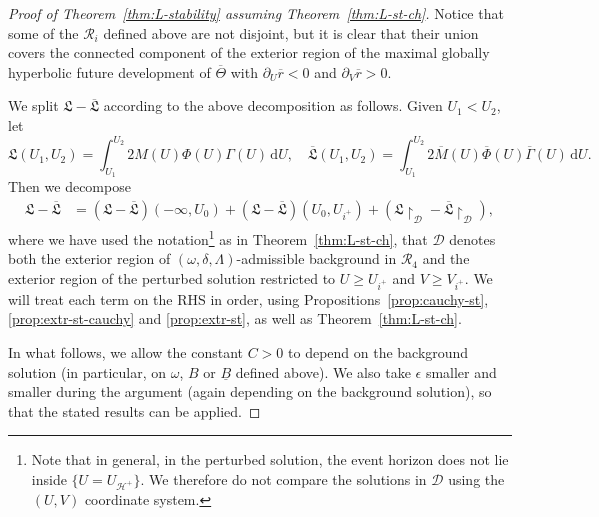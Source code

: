 \documentclass[10pt, reqno]{amsart}
\theoremstyle{definition}
\theoremstyle{remark}
\theoremstyle{conjecture}
\numberwithin{equation}{section}
\newcommand{\ud}{\mathrm{d}}
\newcommand{\rd}{\partial}
\newcommand{\0}{\emptyset}
\newcommand{\Gmm}{\Gamma}
\newcommand{\eps}{\epsilon}
\newcommand{\Lmb}{\Lambda}
\newcommand{\Tht}{\Theta}
\newcommand{\omg}{\omega}
\newcommand{\calD}{\mathcal D}
\newcommand{\calH}{\mathcal H}
\newcommand{\calR}{\mathcal R}
\newcommand{\de}{\delta}
\newcommand{\EH}{\calH^{+}}
\newcommand{\rbg}{\overline{r}}					%
\begin{document}
\begin{proof}[Proof of Theorem~\ref{thm:L-stability} assuming Theorem~\ref{thm:L-st-ch}]
Notice that some of the $\calR_i$ defined above are not disjoint, but it is clear that their union covers the connected component of the exterior region of the maximal globally hyperbolic future development of $\overline{\Tht}$ with $\rd_U \rbg<0$ and $\rd_V \rbg>0$.

We split $\mathfrak{L} - \overline{\mathfrak{L}}$ according to the above decomposition as follows. Given $U_{1} < U_{2}$, let
\begin{equation*}
	\mathfrak{L}(U_{1}, U_{2}) = \int_{U_{1}}^{U_{2}} 2 M(U) \Phi(U) \Gmm(U) \, \ud U, \quad
	\overline{\mathfrak{L}}(U_{1}, U_{2}) = \int_{U_{1}}^{U_{2}} 2 \overline{M}(U) \overline{\Phi}(U) \overline{\Gmm}(U) \, \ud U.
\end{equation*}
Then we decompose
\begin{align*}
	\mathfrak{L} - \overline{\mathfrak{L}}
	& = (\mathfrak{L} - \overline{\mathfrak{L}})(-\infty, U_{0}) 
	+ (\mathfrak{L} - \overline{\mathfrak{L}})(U_{0}, U_{i^{+}}) 
	+ (\mathfrak{L} \restriction_{\calD} - \overline{\mathfrak{L}}\restriction_{\calD}),
\end{align*}
where we have used the notation\footnote{Note that in general, in the perturbed solution, the event horizon does not lie inside $\{U=U_{\EH}\}$. We therefore do not compare the solutions in $\calD$ using the $(U,V)$ coordinate system.} as in Theorem~\ref{thm:L-st-ch}, that $\calD$ denotes both the exterior region of $(\omg,\de,\Lmb)$-admissible background in $\calR_4$ and the exterior region of the perturbed solution restricted to $U\geq U_{i^+}$ and $V\geq V_{i^+}$.
We will treat each term on the RHS in order, using Propositions~\ref{prop:cauchy-st}, \ref{prop:extr-st-cauchy} and \ref{prop:extr-st}, as well as Theorem~\ref{thm:L-st-ch}.

In what follows, we allow the constant $C > 0$ to depend on the background solution (in particular, on $\omg$, $B$ or $\underline{B}$ defined above). We also take $\eps$ smaller and smaller during the argument (again depending on the background solution), so that the stated results can be applied.
 

\end{proof}
\end{document}
